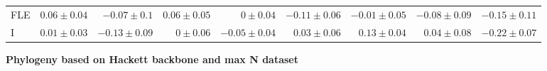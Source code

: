 \begin{landscape}
\begin{table}
\begin{footnotesize}
\begin{tabular}{@{}l|rrrr|rrr|r@{}}
FLE & $0.06 \pm 0.04$ & $-0.07 \pm 0.1$ & $0.06 \pm 0.05$ & $0 \pm 0.04$ & $-0.11 \pm 0.06$ & $-0.01 \pm 0.05$ & $-0.08 \pm 0.09$ & $-0.15 \pm 0.11$\\
I & $0.01 \pm 0.03$ & $-0.13 \pm 0.09$ & $0 \pm 0.06$ & $-0.05 \pm 0.04$ & $0.03 \pm 0.06$ & $0.13 \pm 0.04$ & $0.04 \pm 0.08$ & $-0.22 \pm 0.07$\\
\bottomrule
\end{tabular}
\end{footnotesize}
\end{table}


\clearpage%

\begin{table}
\center
\begin{footnotesize}

\textbf{Phylogeny based on Hackett backbone and max N dataset}


\end{footnotesize}
\end{table}
\end{landscape}

